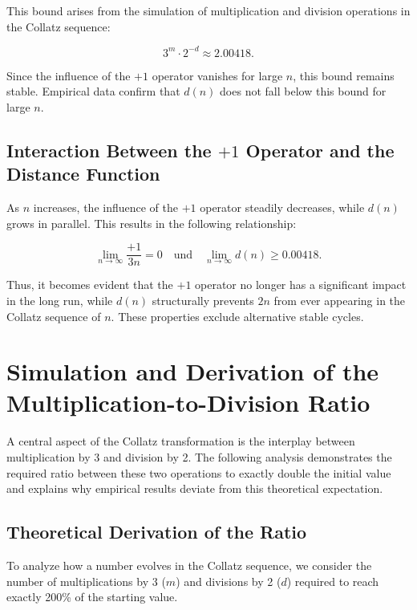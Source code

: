 \documentclass[a4paper,12pt]{article}
\begin{document}
This bound arises from the simulation of multiplication and division operations in the Collatz sequence:

\begin{equation}
    3^m \cdot 2^{-d} \approx 2.00418.
\end{equation}

Since the influence of the \( +1 \) operator vanishes for large \( n \), this bound remains stable. Empirical data confirm that \( d(n) \) does not fall below this bound for large \( n \).

\subsection{Interaction Between the \( +1 \) Operator and the Distance Function}

As \( n \) increases, the influence of the \( +1 \) operator steadily decreases, while \( d(n) \) grows in parallel. This results in the following relationship:

\begin{equation} 
    \lim_{n \to \infty} \frac{+1}{3n} = 0 \quad \text{und} \quad \lim_{n \to \infty} d(n) \geq 0.00418.
\end{equation}

Thus, it becomes evident that the \( +1 \) operator no longer has a significant impact in the long run, while \( d(n) \) structurally prevents \( 2n \) from ever appearing in the Collatz sequence of \( n \). These properties exclude alternative stable cycles.

\section{Simulation and Derivation of the Multiplication-to-Division Ratio}  

A central aspect of the Collatz transformation is the interplay between multiplication by 3 and division by 2. The following analysis demonstrates the required ratio between these two operations to exactly double the initial value and explains why empirical results deviate from this theoretical expectation.  

\subsection{Theoretical Derivation of the Ratio}  

To analyze how a number evolves in the Collatz sequence, we consider the number of multiplications by 3 (\( m \)) and divisions by 2 (\( d \)) required to reach exactly 200\% of the starting value.  
\end{document}
